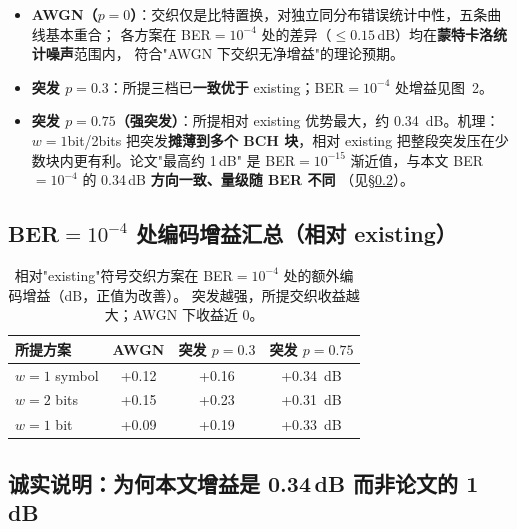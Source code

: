 \documentclass[11pt,a4paper]{article}
\begin{document}
\begin{resultbox}[title=\textbf{结果关键观察}]
\begin{itemize}[leftmargin=1.5em, itemsep=1pt]
\item \textbf{AWGN（$p{=}0$）}：交织仅是比特置换，对独立同分布错误统计中性，五条曲线基本重合；
      各方案在 BER$=10^{-4}$ 处的差异（$\le 0.15$\,dB）均在\textbf{蒙特卡洛统计噪声}范围内，
      符合"AWGN 下交织无净增益"的理论预期。
\item \textbf{突发 $p{=}0.3$}：所提三档已\textbf{一致优于} existing；BER$=10^{-4}$ 处增益见图~2。
\item \textbf{突发 $p{=}0.75$（强突发）}：所提相对 existing 优势最大，约 0.34~dB。机理：$w{=}1$bit/2bits
      把突发\textbf{摊薄到多个 BCH 块}，相对 existing 把整段突发压在少数块内更有利。论文"最高约 1\,dB"
      是 BER$=10^{-15}$ 渐近值，与本文 BER$=10^{-4}$ 的 0.34\,dB \textbf{方向一致、量级随 BER 不同}
      （见\S\ref{sec:caveat}）。
\end{itemize}
\end{resultbox}

\subsection{BER$=10^{-4}$ 处编码增益汇总（相对 existing）}

\begin{table}[!ht]
\centering
\begin{tabular}{lccc}
\toprule
所提方案 & AWGN & 突发 $p{=}0.3$ & 突发 $p{=}0.75$ \\
\midrule
$w=1$ symbol & +0.12 & +0.16 & +0.34~dB \\
$w=2$ bits   & +0.15 & +0.23 & +0.31~dB \\
$w=1$ bit    & +0.09 & +0.19 & +0.33~dB \\
\bottomrule
\end{tabular}
\caption{相对"existing"符号交织方案在 BER$=10^{-4}$ 处的额外编码增益（dB，正值为改善）。
突发越强，所提交织收益越大；AWGN 下收益近 0。}
\end{table}

\subsection{诚实说明：为何本文增益是 0.34\,dB 而非论文的 1\,dB}
\label{sec:caveat}
\end{document}
